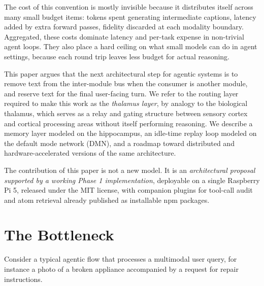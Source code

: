 \documentclass[11pt]{article}
\begin{document}
The cost of this convention is mostly invisible because it
distributes itself across many small budget items: tokens spent
generating intermediate captions, latency added by extra forward
passes, fidelity discarded at each modality boundary. Aggregated,
these costs dominate latency and per-task expense in non-trivial
agent loops. They also place a hard ceiling on what small models
can do in agent settings, because each round trip leaves less
budget for actual reasoning.

This paper argues that the next architectural step for agentic
systems is to remove text from the inter-module bus when the
consumer is another module, and reserve text for the final
user-facing turn. We refer to the routing layer required to make
this work as the \emph{thalamus layer}, by analogy to the
biological thalamus, which serves as a relay and gating structure
between sensory cortex and cortical processing areas without
itself performing reasoning. We describe a memory layer modeled
on the hippocampus, an idle-time replay loop modeled on the
default mode network (DMN), and a roadmap toward distributed and
hardware-accelerated versions of the same architecture.

The contribution of this paper is not a new model. It is an
\emph{architectural proposal supported by a working Phase 1
implementation}, deployable on a single Raspberry Pi 5, released
under the MIT license, with companion plugins for tool-call audit
and atom retrieval already published as installable npm packages.

\section{The Bottleneck}
\label{sec:bottleneck}

Consider a typical agentic flow that processes a multimodal user
query, for instance a photo of a broken appliance accompanied by
a request for repair instructions.
\end{document}
